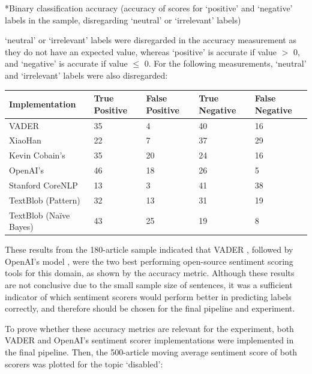 \documentclass{report}
\begin{document}
\vspace{0.2em}
*Binary classification accuracy (accuracy of scores for `positive' and `negative' labels in the sample, disregarding `neutral' or `irrelevant' labels)

`neutral' or `irrelevant' labels were disregarded in the accuracy measurement as they do not have an expected value, whereas `positive' is accurate if value $>$ 0, and `negative' is accurate if value $\le$ 0.
For the following measurements, `neutral' and `irrelevant' labels were also disregarded:

\vspace{0.5em}
\noindent
\begin{tabu} to \textwidth { | X[c] | X[c] | X[c] | X[c] | X[c] |}
	\hline
	Implementation & True Positive & False Positive & True Negative & False Negative \\
	\hline
	VADER \cite{VADER} & 35 & 4 & 40 & 16 \\
	\hline
	XiaoHan \cite{kalchbrennerACL2014} & 22 & 7 & 37 & 29 \\
	\hline
	Kevin Cobain's \cite{kevincobain} & 35 & 20 & 24 & 16 \\
	\hline
	OpenAI's \cite{OpenAI} & 46 & 18 & 26 & 5 \\
	\hline
	Stanford CoreNLP \cite{StanfordNLP} & 13 & 3 & 41 & 38 \\
	\hline
	TextBlob \cite{textblob} (Pattern) & 32 & 13 & 31 & 19 \\
	\hline
	TextBlob \cite{textblob} (Na\"{i}ve Bayes) & 43 & 25 & 19 & 8 \\
	\hline
\end{tabu}
\vspace{0.5em}
	
These results from the 180-article sample indicated that VADER \cite{VADER}, followed by OpenAI's model \cite{OpenAI}, were the two best performing open-source sentiment scoring tools for this domain, as shown by the accuracy metric.
Although these results are not conclusive due to the small sample size of sentences, it was a sufficient indicator of which sentiment scorers would perform better in predicting labels correctly, and therefore should be chosen for the final pipeline and experiment.

To prove whether these accuracy metrics are relevant for the experiment, both VADER and OpenAI's sentiment scorer implementations were implemented in the final pipeline.
Then, the 500-article moving average sentiment score of both scorers was plotted for the topic `disabled':
\end{document}
